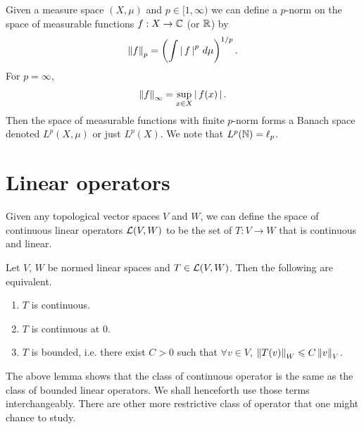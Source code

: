 \documentclass[12pt]{article}
\begin{document}
\begin{mdframed}
\begin{example}[$L^p(X, \mu)$] Given a measure space $(X, \mu)$ and $p \in [1, \infty)$ we can define a $p$-norm on the space of measurable functions $f: X \to \C$ (or $\R$) by 
\begin{align*}
\norm[f]_p = \brac{\int \abs{f}^p \, d\mu }^{1/p}. 
\end{align*}
For $p = \infty$, 
\begin{align*}
\norm[f]_\infty = \sup_{x \in X} \abs{f(x)}. 
\end{align*}
Then the space of measurable functions with finite $p$-norm forms a Banach space denoted $L^p(X, \mu)$ or just $L^p(X)$.  We note that $L^p(\N) = \ell_p$. 
\end{example}
\end{mdframed} 



\section{Linear operators}
Given any topological vector spaces $V$ and $W$, we can define the space of continuous linear operators $\L(V, W)$ to be the set of $T: V \to W$ that is continuous and linear. 
\begin{flemma} Let $V$, $W$ be normed linear spaces and $T \in \L(V, W)$. Then the following are equivalent. 
\begin{enumerate}
\item $T$ is continuous. 
\item $T$ is continuous at $0$. 
\item $T$ is bounded, i.e. there exist $C > 0$ such that $\forall v \in V$, $\norm[T(v)]_W \leq C \norm[v]_V$. 
\end{enumerate}
\end{flemma}
The above lemma shows that the class of continuous operator is the same as the class of bounded linear operators. We shall henceforth use those terms interchangeably. There are other more restrictive class of operator that one might chance to study. 
\end{document}
